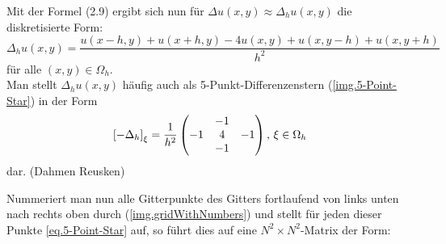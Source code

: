 \label{img.5-Point-Star}

Mit der Formel (2.9) ergibt sich nun für $\Delta u(x,y) \approx \Delta_{h} u(x,y)$ die diskretisierte Form:
\begin{equation}
\Delta_{h} u(x,y) = \frac {u(x-h,y) + u(x+h,y) - 4u(x,y) + u(x,y-h) + u(x,y+h)} {h^{2}}\label{eq.5-Point-Star}
\end{equation}
für alle $(x,y) \in \Omega_{h}$. \\
Man stellt $\Delta_{h} u(x,y)$ häufig auch als 5-Punkt-Differenzenstern (\autoref{img.5-Point-Star}) in der Form
\begin{equation}
\left[-\Delta_{h}\right]_{\xi} = \frac {1} {h^{2}}
\begin{pmatrix}
  & -1 & \\
-1 & 4 & -1 \\
  & -1 & 
\end{pmatrix}
\textnormal{, } \xi \in \Omega_{h}
\end{equation}
dar. (Dahmen Reusken)

\label{img.gridWithNumbers}

Nummeriert man nun alle Gitterpunkte des Gitters fortlaufend von links unten nach rechts oben durch (\autoref{img.gridWithNumbers}) und stellt für jeden dieser Punkte \autoref{eq.5-Point-Star} auf, so führt dies auf eine $N^{2} \times N^{2}$-Matrix der Form:

